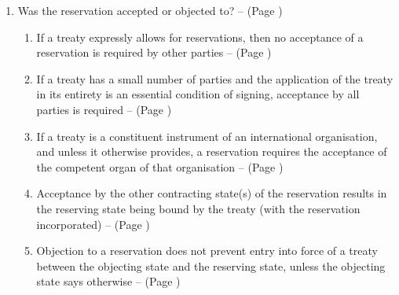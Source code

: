 \begin{enumerate}
\begin{enumerate}
\begin{enumerate}
            \item If a reservation is impermissible: \\ \textit{Briefly mention both points in discussion, and then note the first point is the predominant view.}
            \begin{enumerate}
                \item Traditionally, this \glspl{vitiate} the consent of the state to the treaty as a whole and results in the state not being a party to the treaty (this is the predominant view) -- 
                \item More recently, the offending reservation will be held void, with the state being bound without the protection of the reservation (i.e., it is cut out), unless consent is conditional on reservation, in which case they are not bound to the treaty at all
            \end{enumerate}
        \end{enumerate}
        \item Was the reservation accepted or objected to? --  (Page \pageref{VCLT Art 20})
        \begin{enumerate}
            \item If a treaty expressly allows for reservations, then no acceptance of a reservation is required by other parties --  (Page \pageref{VCLT Art 20})
            \item If a treaty has a small number of parties and the application of the treaty in its entirety is an essential condition of signing, acceptance by all parties is required --  (Page \pageref{VCLT Art 20})
            \item If a treaty is a constituent instrument of an international organisation, and unless it otherwise provides, a reservation requires the acceptance of the competent organ of that organisation --  (Page \pageref{VCLT Art 20})
            \item Acceptance by the other contracting state(s) of the reservation results in the reserving state being bound by the treaty (with the reservation incorporated) --  (Page \pageref{VCLT Art 20})
            \item Objection to a reservation does not prevent entry into force of a treaty between the objecting state and the reserving state, unless the objecting state says otherwise --  (Page \pageref{VCLT Art 20})

\end{enumerate}
\end{enumerate}
\end{enumerate}
